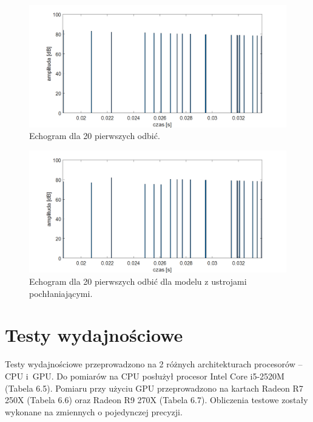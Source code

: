 \begin{figure}[H]
        \centering
                \centering
                \includegraphics[width=16cm]{echogramodbicia}
	\caption{Echogram dla 20 pierwszych odbić.}
\end{figure}

\begin{figure}[H]
        \centering
                \centering
                \includegraphics[width=16cm]{echogramodbiciazpoch}
	\caption{Echogram dla 20 pierwszych odbić dla modelu z ustrojami pochłaniającymi.}
\end{figure}


\section{Testy wydajnościowe}\label{sec:asdas2d}

Testy wydajnościowe przeprowadzono na 2 różnych architekturach procesorów – CPU i~GPU. Do pomiarów na CPU posłużył procesor Intel Core i5-2520M (Tabela 6.5). Pomiaru przy użyciu GPU przeprowadzono na kartach Radeon R7 250X (Tabela 6.6) oraz Radeon R9 270X (Tabela 6.7). Obliczenia testowe zostały wykonane na zmiennych o pojedynczej precyzji.
 
